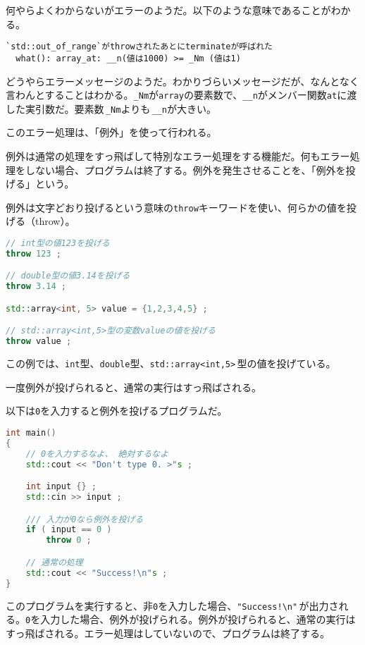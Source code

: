 何やらよくわからないがエラーのようだ。以下のような意味であることがわかる。

\begin{lstlisting}[style=terminal]
`std::out_of_range`がthrowされたあとにterminateが呼ばれた
  what(): array_at: __n(値は1000) >= _Nm (値は1)
\end{lstlisting}

どうやらエラーメッセージのようだ。わかりづらいメッセージだが、なんとなく言わんとすることはわかる。\texttt{\_Nm}が\texttt{array}の要素数で、\texttt{\_\_n}がメンバー関数\texttt{at}に渡した実引数だ。要素数\,\texttt{\_Nm}よりも\,\texttt{\_\_n}が大きい。

このエラー処理は、「例外」を使って行われる。

例外は通常の処理をすっ飛ばして特別なエラー処理をする機能だ。何もエラー処理をしない場合、プログラムは終了する。例外を発生させることを、「例外を投げる」という。

例外は文字どおり投げるという意味の\texttt{throw}キーワードを使い、何らかの値を投げる（throw）。

\ifTombow\pagebreak\fi
\begin{lstlisting}[language={C++}]
// int型の値123を投げる
throw 123 ;

// double型の値3.14を投げる
throw 3.14 ;

std::array<int, 5> value = {1,2,3,4,5} ;

// std::array<int,5>型の変数valueの値を投げる
throw value ;
\end{lstlisting}

この例では、\texttt{int}型、\texttt{double}型、\texttt{std::array<int,5>}\,型の値を投げている。

一度例外が投げられると、通常の実行はすっ飛ばされる。

以下は\texttt{0}を入力すると例外を投げるプログラムだ。

\begin{lstlisting}[language={C++}]
int main()
{
    // 0を入力するなよ、 絶対するなよ
    std::cout << "Don't type 0. >"s ;

    int input {} ;
    std::cin >> input ;

    /// 入力が0なら例外を投げる
    if ( input == 0 )
        throw 0 ;

    // 通常の処理
    std::cout << "Success!\n"s ;
}
\end{lstlisting}

このプログラムを実行すると、非\texttt{0}を入力した場合、\texttt{"Success!{\textbackslash}n"}\,が出力される。\texttt{0}を入力した場合、例外が投げられる。例外が投げられると、通常の実行はすっ飛ばされる。エラー処理はしていないので、プログラムは終了する。

